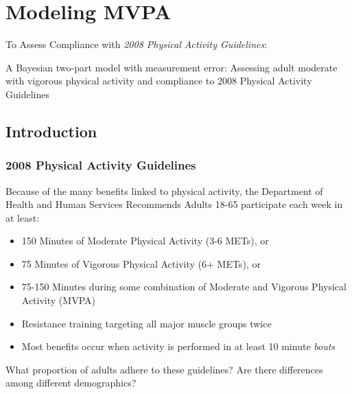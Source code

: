 \documentclass[handout]{beamer}\usepackage[]{graphicx}\usepackage[]{color}
\begin{document}
% 
% 
% 
% 
% 

\section{Modeling MVPA}
\begin{frame}
To Assess Compliance with \emph{2008 Physical Activity Guidelines}:

\vspace{0.4cm}
\huge A Bayesian two-part model with measurement error: Assessing adult moderate with vigorous physical activity and compliance to 2008 Physical Activity Guidelines

\end{frame}

\subsection{Introduction}

\begin{frame}
\frametitle{2008 Physical Activity Guidelines}
Because of the many benefits linked to physical activity, the Department of Health and Human Services Recommends Adults 18-65 participate each week in at least: %



\begin{itemize}
\item
150 Minutes of Moderate Physical Activity (3-6 METs), or
\item
75 Minutes of Vigorous Physical Activity (6+ METs), or
\item
75-150 Minutes during some combination of Moderate and Vigorous Physical Activity (MVPA)
\item
Resistance training targeting all major muscle groups twice
\item
Most benefits occur when activity is performed in at least 10 minute \emph{bouts}
\end{itemize}

\vspace{0.3cm}

What proportion of adults adhere to these guidelines? Are there differences among different demographics?

\end{frame}
\end{document}
